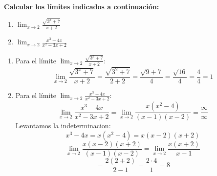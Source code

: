 \documentclass[12pt,answers]{exam}
\begin{document}
\begin{questions}
\vspace{1.9cm}

\question \large\textbf{Calcular los límites indicados a continuación:}
\begin{enumerate}[label=\alph*.]
    \item $\displaystyle \lim_{x\to{2}} \frac{\sqrt{3^x+7}}{x+2}$
    \item $\displaystyle \lim_{x\to{2}} \frac{x^3-4x}{x^2-3x+2}$
\end{enumerate}
\begin{solution}
\begin{enumerate}[label=\alph*.]
    \item Para el límite $\displaystyle \lim_{x\to{2}} \frac{\sqrt{3^x+7}}{x+2}$:
    \[
    \lim_{x \to 2} \frac{\sqrt{3^x+7}}{x+2} = \frac{\sqrt{3^2+7}}{2+2} = \frac{\sqrt{9+7}}{4} = \frac{\sqrt{16}}{4} = \frac{4}{4} = 1
    \]

    \item Para el límite $\displaystyle \lim_{x\to{2}} \frac{x^3-4x}{x^2-3x+2}$:
    \[
    \lim_{x \to 2} \frac{x^3-4x}{x^2-3x+2} = \lim_{x \to 2} \frac{x(x^2-4)}{(x-1)(x-2)}= \frac{\infty}{\infty}
    \]
    Levantamos la indeterminacion:
    \[
    x^3-4x = x(x^2-4) = x(x-2)(x+2)
    \]
    \[
    \lim_{x \to 2} \frac{x(x-2)(x+2)}{(x-1)(x-2)} = \lim_{x \to 2} \frac{x(x+2)}{x-1}
    \]
    \vspace{0.1cm}
    \[
    = \frac{2(2+2)}{2-1} = \frac{2 \cdot 4}{1} = 8
    \]
\end{enumerate}
\vspace{0.5cm}
\end{solution}

\vspace{0.5cm}

\end{questions}
\end{document}
